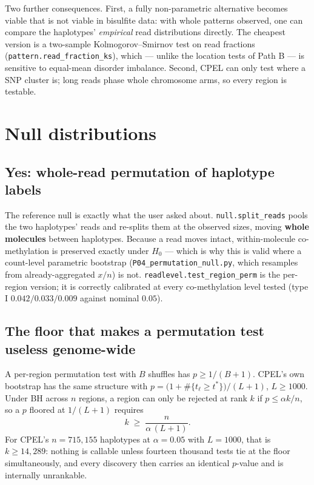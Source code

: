 \documentclass[11pt]{article}
\begin{document}
Two further consequences. First, a fully non-parametric alternative becomes
viable that is not viable in bisulfite data: with whole patterns observed, one
can compare the haplotypes' \emph{empirical} read distributions directly. The
cheapest version is a two-sample Kolmogorov--Smirnov test on read fractions
(\texttt{pattern.read\_fraction\_ks}), which --- unlike the location tests of
Path B --- is sensitive to equal-mean disorder imbalance. Second, CPEL can only
test where a SNP cluster is; long reads phase whole chromosome arms, so every
region is testable.

\section{Null distributions}
\label{sec:null}

\subsection{Yes: whole-read permutation of haplotype labels}

The reference null is exactly what the user asked about.
\texttt{null.split\_reads} pools the two haplotypes' reads and re-splits them at
the observed sizes, moving \textbf{whole molecules} between haplotypes. Because
a read moves intact, within-molecule co-methylation is preserved exactly under
$H_0$ --- which is why this is valid where a count-level parametric bootstrap
(\texttt{P04\_permutation\_null.py}, which resamples from already-aggregated
$x/n$) is not. \texttt{readlevel.test\_region\_perm} is the per-region version;
it is correctly calibrated at every co-methylation level tested (type I
$0.042 / 0.033 / 0.009$ against nominal $0.05$).

\subsection{The floor that makes a permutation test useless genome-wide}

A per-region permutation test with $B$ shuffles has
$p \ge 1/(B+1)$. CPEL's own bootstrap has the same structure with
$p = \bigl(1 + \#\{t_\ell \ge t^*\}\bigr)/(L+1)$, $L \ge 1000$. Under BH across
$n$ regions, a region can only be rejected at rank $k$ if
$p \le \alpha k / n$, so a $p$ floored at $1/(L+1)$ requires
\begin{equation}
k \;\ge\; \frac{n}{\alpha\,(L+1)} .
\end{equation}
For CPEL's $n = 715{,}155$ haplotypes at $\alpha = 0.05$ with $L = 1000$, that
is $k \ge 14{,}289$: nothing is callable unless fourteen thousand tests tie at
the floor simultaneously, and every discovery then carries an identical
$p$-value and is internally unrankable.
\end{document}
